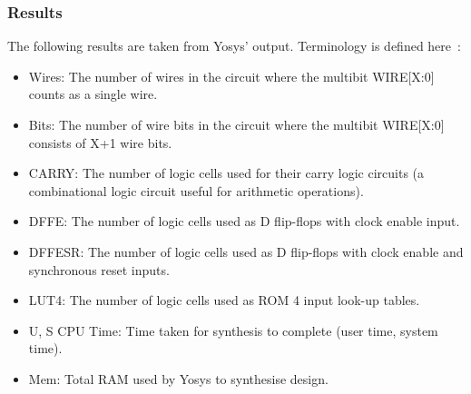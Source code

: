 \documentclass[12pt]{article}
\begin{document}
    \subsubsection{Results} \label{subsubsection:scaling_results}
      The following results are taken from Yosys' output. Terminology is defined here~\cite{techlib}:
      \begin{itemize}
        \item Wires: The number of wires in the circuit where the multibit WIRE[X:0] counts as a single wire.
        \item Bits: The number of wire bits in the circuit where the multibit WIRE[X:0] consists of X+1 wire bits.
        \item CARRY: The number of logic cells used for their carry logic circuits (a combinational logic circuit useful for arithmetic operations).
        \item DFFE: The number of logic cells used as D flip-flops with clock enable input.
        \item DFFESR: The number of logic cells used as D flip-flops with clock enable and synchronous reset inputs.
        \item LUT4: The number of logic cells used as ROM 4 input look-up tables.
        \item U, S CPU Time: Time taken for synthesis to complete (user time, system time).
        \item Mem: Total RAM used by Yosys to synthesise design.
      \end{itemize}
\end{document}

